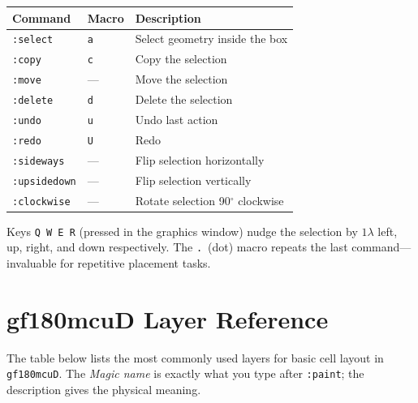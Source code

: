 \documentclass[11pt]{article}
\begin{document}
\begin{center}
\begin{tabular}{@{}lll@{}}
\toprule
\textbf{Command}     & \textbf{Macro} & \textbf{Description} \\
\midrule
\texttt{:select}     & \texttt{a} & Select geometry inside the box \\
\texttt{:copy}       & \texttt{c} & Copy the selection \\
\texttt{:move}       & ---        & Move the selection \\
\texttt{:delete}     & \texttt{d} & Delete the selection \\
\texttt{:undo}       & \texttt{u} & Undo last action \\
\texttt{:redo}       & \texttt{U} & Redo \\
\texttt{:sideways}   & ---        & Flip selection horizontally \\
\texttt{:upsidedown} & ---        & Flip selection vertically \\
\texttt{:clockwise}  & ---        & Rotate selection 90$^\circ$ clockwise \\
\bottomrule
\end{tabular}
\end{center}

Keys \texttt{Q W E R} (pressed in the graphics window) nudge the
selection by $1\lambda$ left, up, right, and down respectively.
The \texttt{.}\ (dot) macro repeats the last command---invaluable for
repetitive placement tasks.

\section{gf180mcuD Layer Reference}

The table below lists the most commonly used layers for basic cell
layout in \texttt{gf180mcuD}.
The \emph{Magic name} is exactly what you type after \texttt{:paint};
the description gives the physical meaning.
\end{document}
